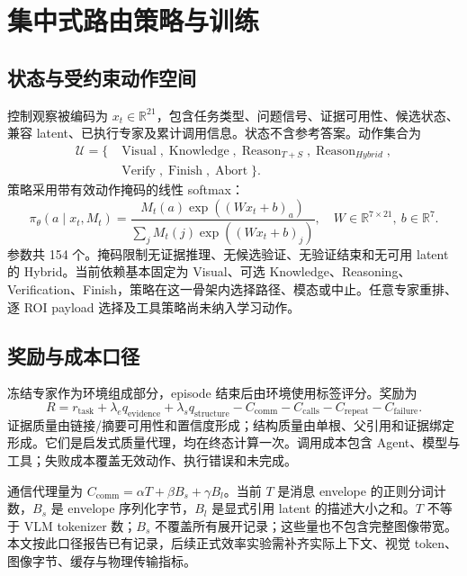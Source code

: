 \documentclass[UTF8,a4paper,zihao=5,fontset=fandol]{ctexart}
\begin{document}
\newpage
\section{集中式路由策略与训练}
\subsection{状态与受约束动作空间}
控制观察被编码为 $x_t\in\mathbb R^{21}$，包含任务类型、问题信号、证据可用性、候选状态、兼容 latent、已执行专家及累计调用信息。状态不含参考答案。动作集合为
\begin{align}
\mathcal U=\{&\operatorname{Visual},\operatorname{Knowledge},
\operatorname{Reason}_{T+S},\operatorname{Reason}_{Hybrid},\nonumber\\
&\operatorname{Verify},\operatorname{Finish},\operatorname{Abort}\}.
\end{align}
策略采用带有效动作掩码的线性 softmax：
\begin{equation}
\pi_\theta(a\mid x_t,M_t)=
\frac{M_t(a)\exp((Wx_t+b)_a)}{\sum_j M_t(j)\exp((Wx_t+b)_j)},
\quad W\in\mathbb R^{7\times21},\ b\in\mathbb R^7.
\end{equation}
参数共 154 个。掩码限制无证据推理、无候选验证、无验证结束和无可用 latent 的 Hybrid。当前依赖基本固定为 Visual、可选 Knowledge、Reasoning、Verification、Finish，策略在这一骨架内选择路径、模态或中止。任意专家重排、逐 ROI payload 选择及工具策略尚未纳入学习动作。

\subsection{奖励与成本口径}
冻结专家作为环境组成部分，episode 结束后由环境使用标签评分。奖励为
\begin{equation}
R=r_{\mathrm{task}}+\lambda_e q_{\mathrm{evidence}}+\lambda_s q_{\mathrm{structure}}
-C_{\mathrm{comm}}-C_{\mathrm{calls}}-C_{\mathrm{repeat}}-C_{\mathrm{failure}}.
\label{eq:reward}
\end{equation}
证据质量由链接/摘要可用性和置信度形成；结构质量由单根、父引用和证据绑定形成。它们是启发式质量代理，均在终态计算一次。调用成本包含 Agent、模型与工具；失败成本覆盖无效动作、执行错误和未完成。

通信代理量为 $C_{\mathrm{comm}}=\alpha T+\beta B_s+\gamma B_l$。当前 $T$ 是消息 envelope 的正则分词计数，$B_s$ 是 envelope 序列化字节，$B_l$ 是显式引用 latent 的描述大小之和。$T$ 不等于 VLM tokenizer 数；$B_s$ 不覆盖所有展开记录；这些量也不包含完整图像带宽。本文按此口径报告已有记录，后续正式效率实验需补齐实际上下文、视觉 token、图像字节、缓存与物理传输指标。
\end{document}
